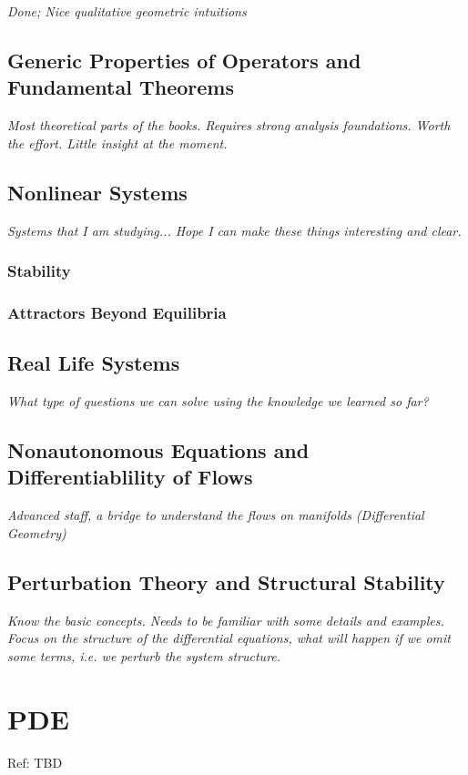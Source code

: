 \documentclass[12pt,oneside]{book}
\begin{document}
    \textit{Done; Nice qualitative geometric intuitions}
    
    \section{Generic Properties of Operators and Fundamental Theorems}
    
    
    \textit{Most theoretical parts of the books. Requires strong analysis foundations. Worth the effort. Little insight at the moment.}
    
    \section{Nonlinear Systems}
    
    \textit{Systems that I am studying... Hope I can make these things interesting and clear.}
    
    \subsection{Stability}
    \subsection{Attractors Beyond Equilibria}
    
    \section{Real Life Systems}
    
    \textit{What type of questions we can solve using the knowledge we learned so far?}
    
    \section{Nonautonomous Equations and Differentiablility of Flows}
    
    \textit{Advanced staff, a bridge to understand the flows on manifolds (Differential Geometry)}
    
    \section{Perturbation Theory and Structural Stability}
    
    \textit{Know the basic concepts. Needs to be familiar with some details and examples. Focus on the structure of the differential equations, what will happen if we omit some terms, i.e. we perturb the system structure.}
    
    \chapter{PDE}
    Ref: TBD
\end{document}
